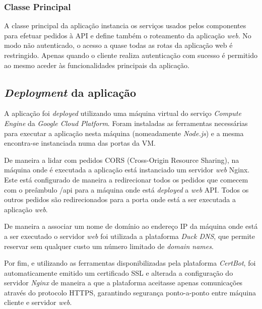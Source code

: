 \subsubsection{Classe Principal}

A classe principal da aplicação instancia os serviços usados pelos componentes para efetuar pedidos à API e define também o roteamento da aplicação \textit{web}. No modo não autenticado, o acesso a quase todas as rotas da aplicação web é restringido. Apenas quando o cliente realiza autenticação com sucesso é permitido ao mesmo aceder às funcionalidades principais da aplicação.

\subsection{\textit{Deployment} da aplicação}

A aplicação foi \textit{deployed} utilizando uma máquina virtual do serviço \textit{Compute Engine} da \textit{Google Cloud Platform}. Foram instaladas as ferramentas necessárias para executar a aplicação nesta máquina (nomeadamente \textit{Node.js}) e a mesma encontra-se instanciada numa das portas da VM. 

\par \medskip

De maneira a lidar com pedidos CORS (Cross-Origin Resource Sharing), na máquina onde é executada a aplicação está instanciado um servidor \textit{web} Nginx. Este está configurado de maneira a redirecionar todos os pedidos que comecem com o preâmbulo /api para a máquina onde está \textit{deployed} a \textit{web} API. Todos os outros pedidos são redirecionados para a porta onde está a ser executada a aplicação \textit{web}.

\par \medskip

De maneira a associar um nome de domínio ao endereço IP da máquina onde está a ser executado o servidor \textit{web} foi utilizada a plataforma \textit{Duck DNS}, que permite reservar sem qualquer custo um número limitado de \textit{domain names}.

\par \medskip

Por fim, e utilizando as ferramentas disponibilizadas pela plataforma \textit{CertBot}, foi automaticamente emitido um certificado SSL e alterada a configuração do servidor \textit{Nginx} de maneira a que a plataforma aceitasse apenas comunicações através do protocolo HTTPS, garantindo segurança ponto-a-ponto entre máquina cliente e servidor \textit{web}.


